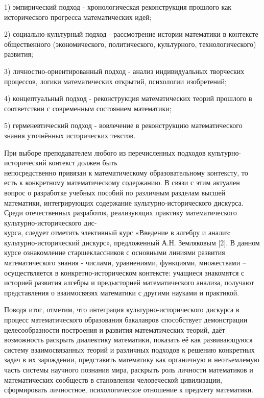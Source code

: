 1) эмпирический подход - хронологическая реконструкция прошлого как исторического прогресса математических идей;

2) социально-культурный подход - рассмотрение истории математики в контексте общественного (экономического, политического, культурного, технологического) развития;

3) личностно-ориентированный подход - анализ индивидуальных творческих процессов, логики математических открытий, психологии изобретений;

4) концептуальный подход - реконструкция математических теорий прошлого в соответствии с современным состоянием математики;

5) герменевтический подход - вовлечение в реконструкцию математического знания уточнённых исторических текстов.

При выборе преподавателем любого из перечисленных подходов культурно-исторический контекст должен быть \\не\-посредственно привязан к математическому образовате\-льному контексту, то есть к конкретному математическому содержанию. В связи с этим актуален вопрос о разработке учебных пособий по различным разделам высшей математики, интегрирующих содержание культурно-исторического дискурса. Среди отечественных разработок, реализующих практику математического культурно-исторического дис-\\курса, следует отметить элективный курс «Введение в алгебру и анализ: культурно-исторический дискурс», предложенный А.Н. Земляковым [2]. В данном курсе ознакомление старшеклассников с основными линиями развития математического знания - числами, уравнениями, функциями, множествами – осуществляется в конкретно-историческом контексте: учащиеся знакомятся с историей развития алгебры и предысторией математического анализа, получают представления о взаимосвязях математики с другими науками и практикой.

Поводя итог, отметим, что интеграция культурно-исто\-ри\-ческого дискурса в процесс математического образования бакалавров способствует демонстрации целесообразности построения и развития математических теорий, даёт возможность раскрыть диалектику математики, показать её как развивающуюся систему взаимосвязанных теорий и различных подходов к решению конкретных задач в их зарождении, представить математику как органичную и неотъемлемую часть системы научного познания мира, раскрыть роль личности математиков и математических сообществ в становлении человеческой цивилизации, сформировать личностное, психологическое отношение к предмету математики.



